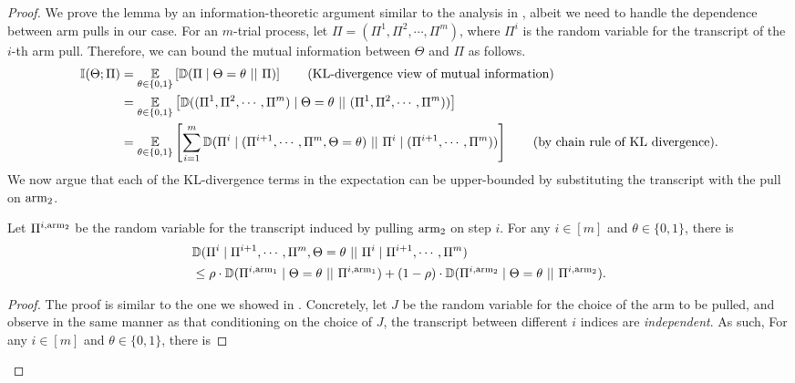 \begin{proof}
	We prove the lemma by an information-theoretic argument similar to the analysis in \cite{AW23BestArm}, albeit we need to handle the dependence between arm pulls in our case. For an $m$-trial process, let $\Pi=(\Pi^{1}, \Pi^{2}, \cdots, \Pi^{m})$, where $\Pi^{i}$ is the random variable for the transcript of the $i$-th arm pull. Therefore, we can bound the mutual information between $\Theta$ and $\Pi$ as follows. %
	\begin{align*}
		\mathbb{I}(\Theta; \Pi) &= \operatorname*{{\mathbb{E}}}_{\theta \in \{0,1\}}\left[\mathbb{D}(\Pi\mid \Theta=\theta~||~\Pi)\right] \tag{KL-divergence view of mutual information}\\
		&= \operatorname*{{\mathbb{E}}}_{\theta \in \{0,1\}}\left[\mathbb{D}((\Pi^{1}, \Pi^{2}, \cdots, \Pi^{m})\mid \Theta=\theta~||~(\Pi^{1}, \Pi^{2}, \cdots, \Pi^{m}))\right]\\
		&= \operatorname*{{\mathbb{E}}}_{\theta \in \{0,1\}}\left[\sum_{i=1}^{m} \mathbb{D}(\Pi^{i} \mid (\Pi^{i+1}, \cdots,\Pi^{m}, \Theta=\theta)~||~\Pi^{i} \mid (\Pi^{i+1}, \cdots,\Pi^{m}))\right] \tag{by chain rule of KL divergence}.
	\end{align*}
	We now argue that each of the KL-divergence terms in the expectation can be upper-bounded by substituting the transcript with the pull on $\textnormal{arm}_{2}$.
	\begin{claim}
		\label{clm:script-trial-ub}
		Let $\Pi^{i, \textnormal{arm}_2}$ be the random variable for the transcript induced by pulling $\textnormal{arm}_2$ on step $i$. For any $i\in [m]$ and $\theta \in \{0,1\}$, there is
		\begin{align*}
			& \mathbb{D}(\Pi^{i} \mid \Pi^{i+1}, \cdots,\Pi^{m}, \Theta=\theta~||~\Pi^{i} \mid \Pi^{i+1}, \cdots,\Pi^{m}) \\
			& \leq \rho \cdot \mathbb{D}(\Pi^{i, \textnormal{arm}_1}\mid \Theta = \theta~||~\Pi^{i, \textnormal{arm}_1}) + (1-\rho)\cdot \mathbb{D}(\Pi^{i, \textnormal{arm}_2}\mid \Theta = \theta~||~\Pi^{i, \textnormal{arm}_2}).
		\end{align*}
	\end{claim}
	\begin{proof}
		The proof is similar to the one we showed in . Concretely, let $J$ be the random variable for the choice of the arm to be pulled, and observe in the same manner as  that conditioning on the choice of $J$, the transcript between different $i$ indices are \emph{independent}. As such, For any $i\in [m]$ and $\theta\in\{0,1\}$, there is

\end{proof}
\end{proof}
